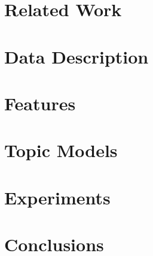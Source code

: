 \documentclass[a4paper,10pt,twoside]{report}
\begin{document}
\clearemptydoublepage

\chapter{Related Work}\label{chapter:related_work}


\clearemptydoublepage

\chapter{Data Description}\label{chapter:data_description}


\clearemptydoublepage

\chapter{Features}\label{chapter:features}


\clearemptydoublepage

\chapter{Topic Models}\label{chapter:topic_models}


\clearemptydoublepage

\chapter{Experiments}\label{chapter:experiments}


\clearemptydoublepage

\chapter{Conclusions}\label{chapter:conclusions}


\clearemptydoublepage

%



 \clearemptydoublepage
 
 \appendix
 
 
 
\end{document}
